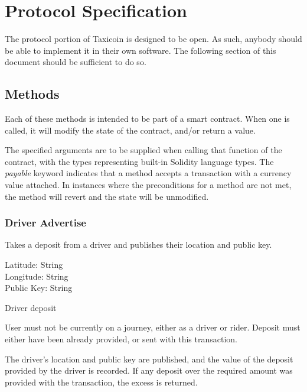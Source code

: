 \section{Protocol Specification}

The protocol portion of Taxicoin is designed to be open. As such, anybody should be able to implement it in their own software. The following section of this document should be sufficient to do so.

\subsection{Methods}

Each of these methods is intended to be part of a smart contract. When one is called, it will modify the state of the contract, and/or return a value.

The specified arguments are to be supplied when calling that function of the contract, with the types representing built-in Solidity language types. The \textit{payable} keyword indicates that a method accepts a transaction with a currency value attached. In instances where the preconditions for a method are not met, the method will revert and the state will be unmodified.

\subsubsection{Driver Advertise}

\begin{description}[leftmargin=8em,style=nextline]
	\item [Description]
		Takes a deposit from a driver and publishes their location and public key.
	\item [Arguments]
		Latitude: String\footnotemark \\
		Longitude: String \\
		Public Key: String
	\item [Payable]
		Driver deposit
	\item [Preconditions]
		User must not be currently on a journey, either as a driver or rider. Deposit must either have been already provided, or sent with this transaction.
	\item [Postconditions]
		The driver's location and public key are published, and the value of the deposit provided by the driver is recorded. If any deposit over the required amount was provided with the transaction, the excess is returned.
\end{description}

